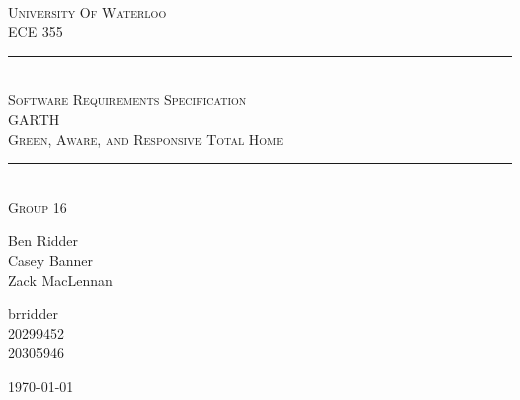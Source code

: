 \begin{titlepage}
\begin{center}
\vfill
\hfill
\\[2cm]
\textsc{\LARGE University Of Waterloo}
\\[1cm]
\textsc{\LARGE ECE 355}
\\[2cm]

\hrule
\hfill
\\[0.5cm]
\textsc{\huge Software Requirements Specification}
\\[0.5cm]
\textsc{\huge GARTH}
\\[0.5cm]
\textsc{\huge Green, Aware, and Responsive Total Home}
\\[0.5cm]
\hrule
\hfill
\\[1cm]
\textsc{\LARGE Group 16} \\[0.4cm]

\begin{minipage}{0.4\textwidth}
\begin{flushleft} \large
Ben Ridder \\
Casey Banner \\
Zack MacLennan
\end{flushleft}
\end{minipage}
\begin{minipage}{0.4\textwidth}
\begin{flushright} \large
brridder \\
20299452 \\
20305946 
\end{flushright}
\end{minipage}


\vfill

{\large \today}
\end{center}
\end{titlepage}
